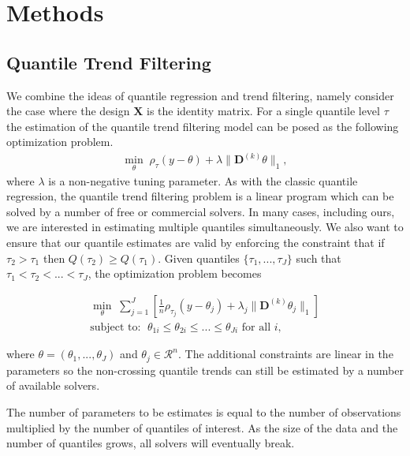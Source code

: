 \documentclass[12pt]{article}
\begin{document}
	\section{Methods}
	
	\subsection{Quantile Trend Filtering}
	
	We combine the ideas of quantile regression and trend filtering, namely consider the case where the design $\mathbf{X}$ is the identity matrix. For a single quantile level $\tau$ the estimation of the quantile trend filtering model can be posed as the following optimization problem.
	\begin{eqnarray}
	\label{eq:quantile_trend}
	\underset{\theta}{\min}\; \rho_\tau(y - \theta) + \lambda \lVert \mathbf{D}^{(k)} \theta \rVert_1,
	\end{eqnarray}
	where $\lambda$ is a non-negative tuning parameter. As with the classic quantile regression, the quantile trend filtering problem is a linear program which can be solved by a number of free or commercial solvers. In many cases, including ours, we are interested in estimating multiple quantiles simultaneously. We also want to ensure that our quantile estimates are valid by enforcing the constraint that if $\tau_2 > \tau_1$ then $Q(\tau_2) \ge Q(\tau_1)$. Given quantiles $\{\tau_1, ..., \tau_J\}$ such that $\tau_1 < \tau_2 < ... < \tau_J$, the optimization problem becomes 
	
	\begin{eqnarray}
	\label{eq:quantile_trend}
	\underset{\theta}{\min}\; \sum_{j=1}^J \left [\frac{1}{n} \rho_{\tau_j}(y - \theta_{j}) + 
	\lambda_j \lVert \mathbf{D}^{(k)} \theta_j \rVert_1 \right ] \\
	 \text{subject to: }\; \theta_{1i} \le \theta_{2i} \le ... \le \theta_{Ji} \text{ for all } i,
	\end{eqnarray}
	
	where $\theta = (\theta_1, ..., \theta_J)$ and $\theta_j \in \mathcal{R}^n$. The additional constraints are linear in the parameters so the non-crossing quantile trends can still be estimated by a number of available solvers. 
	
	The number of parameters to be estimates is equal to the number of observations multiplied by the number of quantiles of interest. As the size of the data and the number of quantiles grows, all solvers will eventually break. 
	
\end{document}
